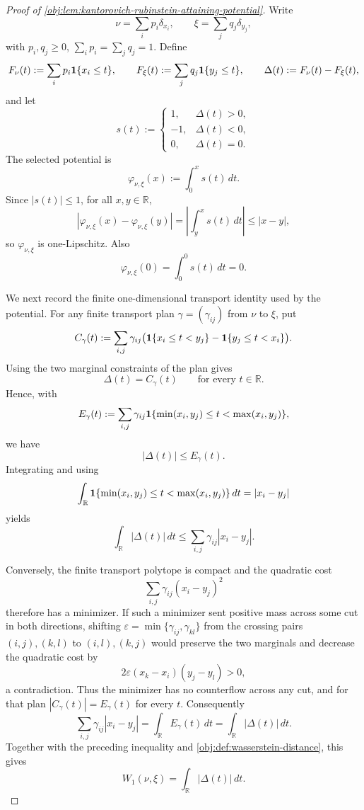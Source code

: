 \documentclass[11pt]{article}
\begin{document}
\begin{proof}[Proof of \cref{obj:lem:kantorovich-rubinstein-attaining-potential}]
Write
\[
\nu=\sum_i p_i\delta_{x_i},
\qquad
\xi=\sum_j q_j\delta_{y_j},
\]
with \(p_i,q_j\ge0\), \(\sum_i p_i=\sum_jq_j=1\).  Define
\[
F_\nu(t):=\sum_i p_i{\bf 1}\{x_i\le t\},
\qquad
F_\xi(t):=\sum_j q_j{\bf 1}\{y_j\le t\},
\qquad
\Delta(t):=F_\nu(t)-F_\xi(t),
\]
and let
\[
s(t):=
\begin{cases}
1,&\Delta(t)>0,\\
-1,&\Delta(t)<0,\\
0,&\Delta(t)=0.
\end{cases}
\]
The selected potential is
\[
\varphi_{\nu,\xi}(x):=\int_0^x s(t)\,dt .
\]
Since \(|s(t)|\le1\), for all \(x,y\in\mathbb R\),
\[
|\varphi_{\nu,\xi}(x)-\varphi_{\nu,\xi}(y)|
=
\left|\int_y^x s(t)\,dt\right|
\le |x-y|,
\]
so \(\varphi_{\nu,\xi}\) is one-Lipschitz.  Also
\[
\varphi_{\nu,\xi}(0)=\int_0^0 s(t)\,dt=0 .
\]

We next record the finite one-dimensional transport identity used by the potential.  For any finite transport plan \(\gamma=(\gamma_{ij})\) from \(\nu\) to \(\xi\), put
\[
C_\gamma(t)
:=
\sum_{i,j}\gamma_{ij}
\bigl(
{\bf 1}\{x_i\le t<y_j\}
-
{\bf 1}\{y_j\le t<x_i\}
\bigr).
\]
Using the two marginal constraints of the plan gives
\[
\Delta(t)=C_\gamma(t)
\qquad\text{for every }t\in\mathbb R .
\]
Hence, with
\[
E_\gamma(t):=
\sum_{i,j}\gamma_{ij}
{\bf 1}\{\min(x_i,y_j)\le t<\max(x_i,y_j)\},
\]
we have
\[
|\Delta(t)|\le E_\gamma(t).
\]
Integrating and using
\[
\int_{\mathbb R}{\bf 1}\{\min(x_i,y_j)\le t<\max(x_i,y_j)\}\,dt
=
|x_i-y_j|
\]
yields
\[
\int_{\mathbb R}|\Delta(t)|\,dt
\le
\sum_{i,j}\gamma_{ij}|x_i-y_j|.
\]

Conversely, the finite transport polytope is compact and the quadratic cost
\[
\sum_{i,j}\gamma_{ij}(x_i-y_j)^2
\]
therefore has a minimizer.  If such a minimizer sent positive mass across some cut in both directions, shifting
\(\varepsilon=\min\{\gamma_{ij},\gamma_{kl}\}\) from the crossing pairs \((i,j),(k,l)\) to \((i,l),(k,j)\) would preserve the two marginals and decrease the quadratic cost by
\[
2\varepsilon(x_k-x_i)(y_j-y_l)>0,
\]
a contradiction.  Thus the minimizer has no counterflow across any cut, and for that plan \(|C_\gamma(t)|=E_\gamma(t)\) for every \(t\).  Consequently
\[
\sum_{i,j}\gamma_{ij}|x_i-y_j|
=
\int_{\mathbb R}E_\gamma(t)\,dt
=
\int_{\mathbb R}|\Delta(t)|\,dt .
\]
Together with the preceding inequality and \cref{obj:def:wasserstein-distance}, this gives
\[
W_1(\nu,\xi)=\int_{\mathbb R}|\Delta(t)|\,dt .
\]


\end{proof}
\end{document}
